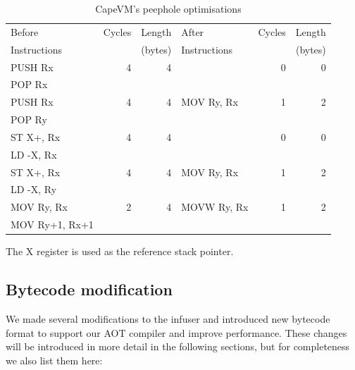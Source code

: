 \begin{table}
\caption{CapeVM's peephole optimisations}
\label{tbl-CapeVM-peephole}
    \begin{threeparttable}
    \begin{tabular}{lrrlrr} %
    \toprule
    Before         & Cycles & Length  & After        & Cycles & Length \\
    Instructions   &        & (bytes) & Instructions &        & (bytes) \\
    \midrule
    \midrule
    PUSH Rx        & 4      & 4       &              & 0      & 0 \\
    POP Rx         &        &         &              &        & \\
    \midrule
    PUSH Rx        & 4      & 4       & MOV Ry, Rx   & 1      & 2 \\
    POP Ry         &        &         &              &        & \\
    \midrule
    ST X+, Rx      & 4      & 4       &              & 0      & 0 \\
    LD -X, Rx      &        &         &              &        & \\
    \midrule
    ST X+, Rx      & 4      & 4       & MOV Ry, Rx   & 1      & 2 \\
    LD -X, Ry      &        &         &              &        & \\
    \midrule
    MOV Ry, Rx     & 2      & 4       & MOVW Ry, Rx  & 1      & 2 \\
    MOV Ry+1, Rx+1 &        &         &              &        & \\
    \bottomrule
    \end{tabular}
    \begin{tablenotes}
    \item The X register is used as the reference stack pointer.
    \end{tablenotes}
    \end{threeparttable}
\end{table}


\subsection{Bytecode modification}
\label{sec-vm-design-bytecode-modifications}
We made several modifications to the infuser and introduced new bytecode format to support our AOT compiler and improve performance. These changes will be introduced in more detail in the following sections, but for completeness we also list them here:

